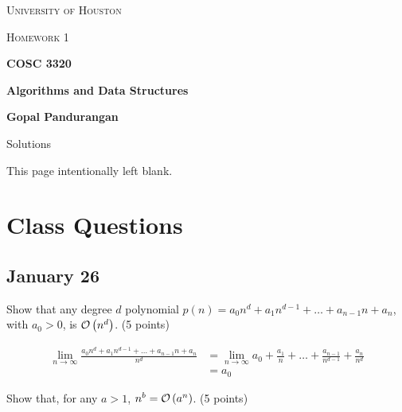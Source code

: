 \documentclass{article}
\begin{document}
\begin{titlepage}
    \begin{center}
        {\scshape\LARGE University of Houston\par}
        \vspace{1cm}
        {\scshape\Large Homework 1 \par}
        \vspace{1.5cm}
        {\huge\bfseries COSC 3320 \par}
        {\huge\bfseries Algorithms and Data Structures \par}
        \vspace{0.5cm}
        {\large\bfseries Gopal Pandurangan\par}
        \vspace{2cm}
        {\Large Solutions\par}
    \end{center}
\end{titlepage}
\vspace*{\fill}\begin{center}{\Huge This page intentionally left blank.}\end{center}\vspace*{\fill}\thispagestyle{empty}\clearpage
{}

\section{Class Questions}
\subsection{January 26}

\begin{question}
    Show that any degree $d$ polynomial $p(n) = a_0n^d + a_1n^{d - 1} + \dots + a_{n-1}n + a_n$, with $a_0 > 0$, is $\mathcal{O}\left(n^d\right)$. (5 points)
\end{question}

\begin{solution}
    \begin{align*}\lim_{n\to\infty}\frac{a_0n^d + a_1n^{d - 1} + \dots + a_{n-1}n + a_n}{n^d}
         & =\lim_{n\to\infty}a_0 + \frac{a_1}{n} + \dots + \frac{a_{n-1}}{n^{d-1}} + \frac{a_n}{n^d} \\
         & = a_0
    \end{align*}
\end{solution}

\begin{question}
    Show that, for any $a > 1$, $n^b = \mathcal{O}\left(a^n\right)$. (5 points)
\end{question}
\end{document}
